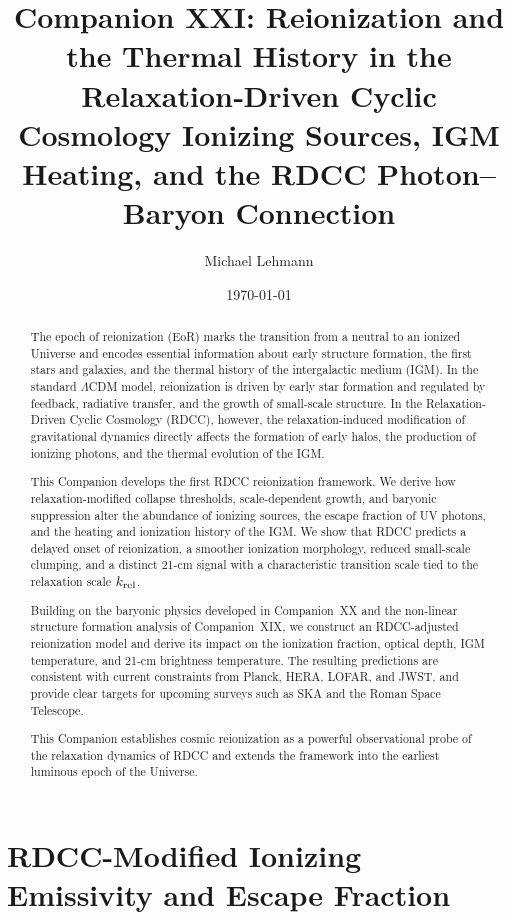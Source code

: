 \documentclass[11pt,a4paper]{article}
\title{\textbf{Companion XXI: Reionization and the Thermal History in the Relaxation‑Driven Cyclic Cosmology Ionizing Sources, IGM Heating, and the RDCC Photon–Baryon Connection}}
\author[1]{Michael Lehmann}
\affil[1]{\small Independent Researcher, Relaxation-Driven Cyclic Cosmology (RDCC) Framework\\
\texttt{mi.lehmann@gmx.de}}
\date{\small \today}
\begin{document}
\maketitle

\begin{abstract}
The epoch of reionization (EoR) marks the transition from a neutral to an ionized Universe
and encodes essential information about early structure formation, the first stars and galaxies,
and the thermal history of the intergalactic medium (IGM). In the standard $\Lambda$CDM
model, reionization is driven by early star formation and regulated by feedback, radiative
transfer, and the growth of small-scale structure. In the Relaxation-Driven Cyclic Cosmology
(RDCC), however, the relaxation-induced modification of gravitational dynamics directly
affects the formation of early halos, the production of ionizing photons, and the thermal
evolution of the IGM.

This Companion develops the first RDCC reionization framework. We derive how
relaxation-modified collapse thresholds, scale-dependent growth, and baryonic suppression
alter the abundance of ionizing sources, the escape fraction of UV photons, and the heating
and ionization history of the IGM. We show that RDCC predicts a delayed onset of
reionization, a smoother ionization morphology, reduced small-scale clumping, and a distinct
21-cm signal with a characteristic transition scale tied to the relaxation scale $k_{\rm rel}$.

Building on the baryonic physics developed in Companion~XX and the non-linear structure
formation analysis of Companion~XIX, we construct an RDCC-adjusted reionization model
and derive its impact on the ionization fraction, optical depth, IGM temperature, and 21-cm
brightness temperature. The resulting predictions are consistent with current constraints from
Planck, HERA, LOFAR, and JWST, and provide clear targets for upcoming surveys such as
SKA and the Roman Space Telescope.

This Companion establishes cosmic reionization as a powerful observational probe of the
relaxation dynamics of RDCC and extends the framework into the earliest luminous epoch of
the Universe.
\end{abstract}

\section{RDCC-Modified Ionizing Emissivity and Escape Fraction}
\end{document}
